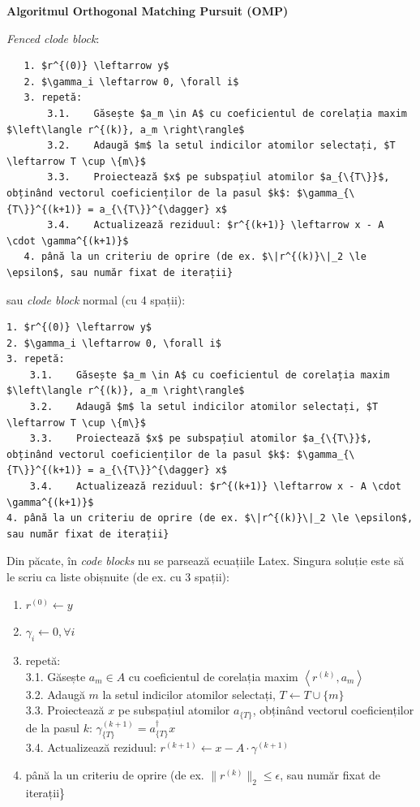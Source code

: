 \documentclass[]{article}
\providecommand{\tightlist}{%
  \setlength{\itemsep}{0pt}\setlength{\parskip}{0pt}}
\begin{document}
\textbf{Algoritmul Orthogonal Matching Pursuit (OMP)}

\emph{Fenced clode block}:

\begin{verbatim}
   1. $r^{(0)} \leftarrow y$
   2. $\gamma_i \leftarrow 0, \forall i$
   3. repetă:  
       3.1.    Găsește $a_m \in A$ cu coeficientul de corelația maxim $\left\langle r^{(k)}, a_m \right\rangle$  
       3.2.    Adaugă $m$ la setul indicilor atomilor selectați, $T \leftarrow T \cup \{m\}$  
       3.3.    Proiectează $x$ pe subspațiul atomilor $a_{\{T\}}$, obținând vectorul coeficienților de la pasul $k$: $\gamma_{\{T\}}^{(k+1)} = a_{\{T\}}^{\dagger} x$  
       3.4.    Actualizează reziduul: $r^{(k+1)} \leftarrow x - A \cdot \gamma^{(k+1)}$
   4. până la un criteriu de oprire (de ex. $\|r^{(k)}\|_2 \le \epsilon$, sau număr fixat de iterații}  
\end{verbatim}

sau \emph{clode block} normal (cu 4 spații):

\begin{verbatim}
1. $r^{(0)} \leftarrow y$
2. $\gamma_i \leftarrow 0, \forall i$
3. repetă:  
    3.1.    Găsește $a_m \in A$ cu coeficientul de corelația maxim $\left\langle r^{(k)}, a_m \right\rangle$  
    3.2.    Adaugă $m$ la setul indicilor atomilor selectați, $T \leftarrow T \cup \{m\}$  
    3.3.    Proiectează $x$ pe subspațiul atomilor $a_{\{T\}}$, obținând vectorul coeficienților de la pasul $k$: $\gamma_{\{T\}}^{(k+1)} = a_{\{T\}}^{\dagger} x$  
    3.4.    Actualizează reziduul: $r^{(k+1)} \leftarrow x - A \cdot \gamma^{(k+1)}$
4. până la un criteriu de oprire (de ex. $\|r^{(k)}\|_2 \le \epsilon$, sau număr fixat de iterații}  
\end{verbatim}

Din păcate, în \emph{code blocks} nu se parsează ecuațiile Latex.
Singura soluție este să le scriu ca liste obișnuite (de ex. cu 3
spații):

\begin{enumerate}
\def\labelenumi{\arabic{enumi}.}
\tightlist
\item
  \(r^{(0)} \leftarrow y\)
\item
  \(\gamma_i \leftarrow 0, \forall i\)
\item
  repetă:\\
   3.1. Găsește \(a_m \in A\) cu coeficientul de corelația maxim
  \(\left\langle r^{(k)}, a_m \right\rangle\)\\
   3.2. Adaugă \(m\) la setul indicilor atomilor selectați,
  \(T \leftarrow T \cup \{m\}\)\\
   3.3. Proiectează \(x\) pe subspațiul atomilor \(a_{\{T\}}\), obținând
  vectorul coeficienților de la pasul \(k\):
  \(\gamma_{\{T\}}^{(k+1)} = a_{\{T\}}^{\dagger} x\)\\
   3.4. Actualizează reziduul:
  \(r^{(k+1)} \leftarrow x - A \cdot \gamma^{(k+1)}\)
\item
  până la un criteriu de oprire (de ex. \(\|r^{(k)}\|_2 \le \epsilon\),
  sau număr fixat de iterații\}
\end{enumerate}
\end{document}
